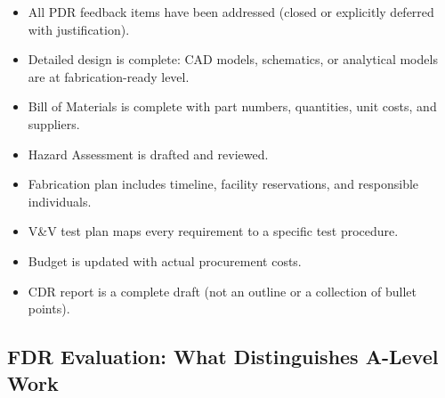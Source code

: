 \begin{itemize}[nosep,leftmargin=1.5em]
\item[$\square$] All PDR feedback items have been addressed (closed or explicitly deferred with justification).
\item[$\square$] Detailed design is complete: CAD models, schematics, or analytical models are at fabrication-ready level.
\item[$\square$] Bill of Materials is complete with part numbers, quantities, unit costs, and suppliers.
\item[$\square$] Hazard Assessment is drafted and reviewed.
\item[$\square$] Fabrication plan includes timeline, facility reservations, and responsible individuals.
\item[$\square$] V\&V test plan maps every requirement to a specific test procedure.
\item[$\square$] Budget is updated with actual procurement costs.
\item[$\square$] CDR report is a complete draft (not an outline or a collection of bullet points).
\end{itemize}

\subsection{FDR Evaluation: What Distinguishes A-Level Work}

